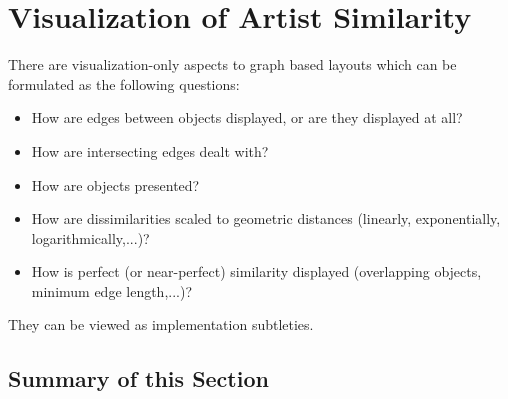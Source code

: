 \section{Visualization of Artist Similarity}

There are visualization-only aspects to graph based layouts which can be formulated as the following questions:

\begin{itemize}
	\item How are edges between objects displayed, or are they displayed at all?
	\item How are intersecting edges dealt with?
	\item How are objects presented?
	\item How are dissimilarities scaled to geometric distances (linearly, exponentially, logarithmically,...)?
	\item How is perfect (or near-perfect) similarity displayed (overlapping objects, minimum edge length,...)?
\end{itemize}

They can be viewed as implementation subtleties.

\subsection{Summary of this Section}